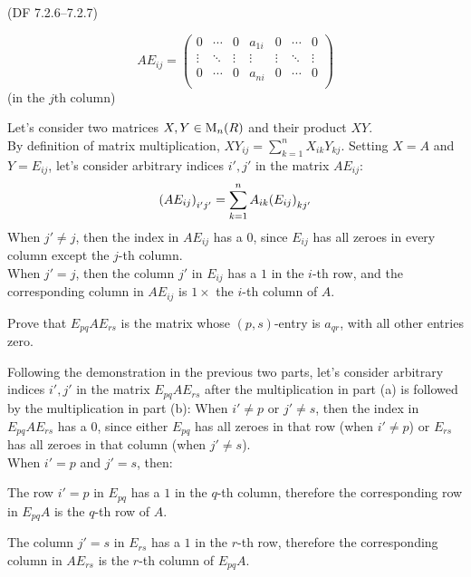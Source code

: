 \begin{problem}{(\textsf{DF 7.2.6--7.2.7})}
\begin{enumalph}
      \[
        AE_{ij}=\begin{pmatrix}
        0 & \cdots & 0 & a_{1i} & 0 & \cdots & 0 \\
        \vdots & \ddots & \vdots & \vdots & \vdots & \ddots & \vdots \\
        0 & \cdots & 0 & a_{ni} & 0 & \cdots & 0 \\
        \end{pmatrix}
      \]
      (in the $j$th column)
      \begin{Answer}
        Let's consider two matrices $X, Y \in \operatorname{M}_n(R)$ and their product $XY$. \\
        By definition of matrix multiplication, ${XY}_{ij} = \sum_{k=1}^n X_{ik}Y_{kj}$.
        Setting $X=A$ and $Y=E_{ij}$, let's consider arbitrary indices $i', j'$ in the
        matrix $AE_{ij}$:
        \[
          {(AE_{ij})}_{i'j'} = \sum_{k=1}^n A_{ik}{(E_{ij})}_{kj'} \\
        \]
        When $j' \neq j$, then the index in $AE_{ij}$ has a $0$,
        since $E_{ij}$ has all zeroes in every column except the $j$-th column. \\
        When $j' = j$, then the column $j'$ in $E_{ij}$ has a $1$ in the $i$-th row,
        and the corresponding column in $AE_{ij}$ is $1 \times$ the $i$-th column of $A$.
      \end{Answer}
    \item Prove that $E_{pq}AE_{rs}$ is the matrix whose $(p,s)$-entry
      is $a_{qr}$, with all other entries zero.
      \begin{Answer}
        Following the demonstration in the previous two parts, let's consider
        arbitrary indices $i', j'$ in the matrix $E_{pq}AE_{rs}$
        after the multiplication in part (a) is followed by the multiplication in part  (b):
        When $i' \neq p$ or $j' \neq s$, then the index in $E_{pq}AE_{rs}$ has a $0$,
        since either $E_{pq}$ has all zeroes in that row (when $i' \neq p$)
        or $E_{rs}$ has all zeroes in that column (when $j' \neq s$). \\
        When $i' = p$ and $j' = s$, then:
        \begin{enumalph}
          \item The row $i' = p$ in $E_{pq}$ has a $1$ in the $q$-th column,
            therefore the corresponding row in $E_{pq}A$ is the $q$-th row of $A$.
          \item The column $j' = s$ in $E_{rs}$ has a $1$ in the $r$-th row,
            therefore the corresponding column in $AE_{rs}$ is the $r$-th column of $E_{pq}A$.

\end{enumalph}
\end{Answer}
\end{enumalph}
\end{problem}
